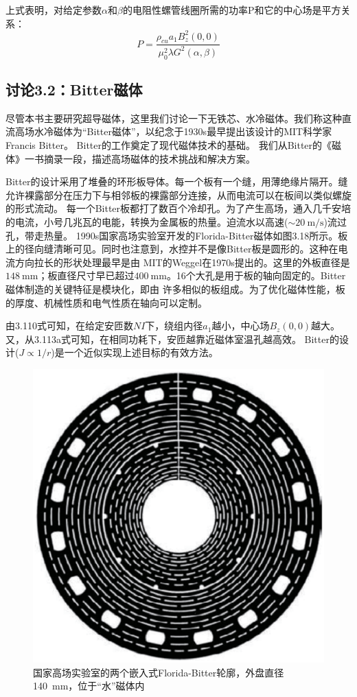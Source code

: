 上式表明，对给定参数$\alpha$和$\beta$的电阻性螺管线圈所需的功率P和它的中心场是平方关系：
\begin{equation*}
P=\frac{\rho_{cu}a_1B_z^2(0,0)}{\mu_0^2\lambda G^2(\alpha,\beta)}\tag{3.113c}%
\end{equation*}

\subsection{讨论3.2：Bitter磁体}
尽管本书主要研究超导磁体，这里我们讨论一下无铁芯、水冷磁体。我们称这种直流高场水冷磁体为“Bitter磁体”，以纪念于1930s最早提出该设计的MIT科学家Francis Bitter。
Bitter的工作奠定了现代磁体技术的基础。
我们从Bitter的《磁体》一书摘录一段，描述高场磁体的技术挑战和解决方案。


Bitter的设计采用了堆叠的环形板导体。每一个板有一个缝，用薄绝缘片隔开。缝允许裸露部分在压力下与相邻板的裸露部分连接，从而电流可以在板间以类似螺旋的形式流动。
每一个Bitter板都打了数百个冷却孔。为了产生高场，通入几千安培的电流，小号几兆瓦的电能，转换为金属板的热量。迫流水以高速($\sim 20\ \mathrm{m/s}$)流过孔，带走热量。
1990s国家高场实验室开发的Florida-Bitter磁体如图3.18所示。板上的径向缝清晰可见。同时也注意到，水控并不是像Bitter板是圆形的。这种在电流方向拉长的形状处理最早是由
MIT的Weggel在1970s提出的。这里的外板直径是$148\ \mathrm{mm}$；板直径尺寸早已超过$400\ \mathrm{mm}$。16个大孔是用于板的轴向固定的。Bitter磁体制造的关键特征是模块化，即由
许多相似的板组成。为了优化磁体性能，板的厚度、机械性质和电气性质在轴向可以定制。

由3.110式可知，在给定安匝数$NI$下，绕组内径$a_1$越小，中心场$B_z(0,0)$越大。又，从3.113a式可知，在相同功耗下，安匝越靠近磁体室温孔越高效。
Bitter的设计($J\propto 1/r$)是一个近似实现上述目标的有效方法。

\begin{figure}[htbp]
  \centering
 \includegraphics[scale=0.5]{chpt3/figs/fig3.18.eps}
  \caption{国家高场实验室的两个嵌入式Florida-Bitter轮廓，外盘直径140\ mm，位于“水”磁体内}
\end{figure}

